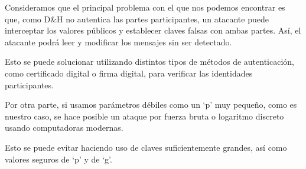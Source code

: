 Consideramos que el principal problema con el que nos podemos encontrar es que, como D\&H no autentica las partes participantes, un atacante puede interceptar los valores públicos y establecer claves falsas con ambas partes. Así, el atacante podrá leer y modificar los mensajes sin ser detectado. 

Esto se puede solucionar utilizando distintos tipos de métodos de autenticación, como certificado digital o firma digital, para verificar las identidades participantes. 

Por otra parte, si usamos parámetros débiles como un ‘p’ muy pequeño, como es nuestro caso, se hace posible un ataque por fuerza bruta o logaritmo discreto usando computadoras modernas. 

Esto se puede evitar haciendo uso de claves suficientemente grandes, así como valores seguros de ‘p’ y de ‘g’. 

